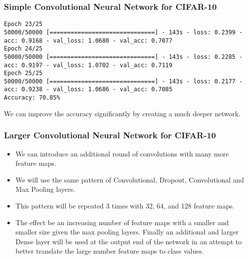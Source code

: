 \begin{frame}[fragile] \frametitle{Simple Convolutional Neural Network for CIFAR-10}
\begin{lstlisting}
Epoch 23/25
50000/50000 [==============================] - 143s - loss: 0.2399 - acc: 0.9168 - val_loss: 1.0680 - val_acc: 0.7077
Epoch 24/25
50000/50000 [==============================] - 143s - loss: 0.2285 - acc: 0.9197 - val_loss: 1.0702 - val_acc: 0.7119
Epoch 25/25
50000/50000 [==============================] - 143s - loss: 0.2177 - acc: 0.9238 - val_loss: 1.0686 - val_acc: 0.7085
Accuracy: 70.85%
\end{lstlisting}
We can improve the accuracy significantly by creating a much deeper network. 
\end{frame}

\begin{frame}[fragile] \frametitle{Larger Convolutional Neural Network for CIFAR-10}
\begin{itemize}
\item We can introduce an additional round of convolutions with many more feature maps. 
\item We will use the same pattern of Convolutional, Dropout, Convolutional and Max Pooling layers.
\item This pattern will be repeated 3 times with 32, 64, and 128 feature maps. 
\item The effect be an increasing number of feature maps with a smaller and smaller size given the max pooling layers. Finally an additional and larger Dense layer will be used at the output end of the network in an attempt to better translate the large number feature maps to class values.
\end{itemize}
\end{frame}


